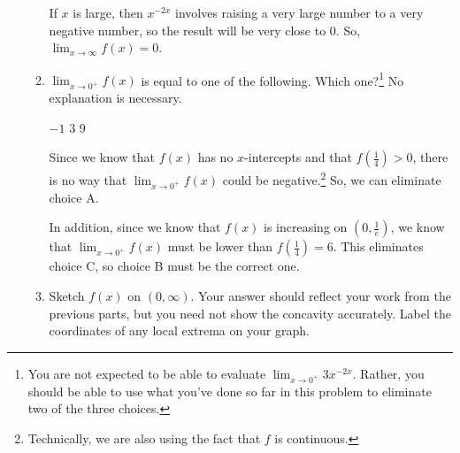 \documentclass{article}
\begin{document}
\begin{enumerate}
\begin{enumerate}
    \begin{solution}
      If $x$ is large, then $x^{-2x}$ involves raising a very large number
      to a very negative number, so the result will be very close to 0.
      So, $\displaystyle \lim_{x \to \infty} f(x) = \boxed{0}$.     
    \end{solution}

  \item 

    $\displaystyle \lim_{x \to 0^+} f(x)$ is equal to one of the
    following.  Which one?\footnote{You are not expected to be able to
      evaluate $\displaystyle \lim_{x \to 0^+} 3x^{-2x}$.  Rather, you
      should be able to use what you've done so far in this problem to
      eliminate two of the three choices.}  No explanation is necessary. 
    \begin{multicols}{3}
      \begin{enumerate}[label=\protect\maybecircle{\Alph*.}]
      \plainitem $-1$
      \circleitem $3$
      \plainitem $9$
      \end{enumerate}
    \end{multicols}

    \begin{solution}
      Since we know that $f(x)$ has no $x$-intercepts and that $f \left(
        \frac{1}{4} \right) > 0$, there is no way that $\displaystyle
      \lim_{x \to 0^+} f(x)$ could be negative.\footnote{Technically, we
        are also using the fact that $f$ is continuous.}  So, we can
      eliminate choice A.

      In addition, since we know that $f(x)$ is increasing on $\left( 0,
        \frac{1}{e} \right)$, we know that $\displaystyle \lim_{x \to 0^+}
      f(x)$ must be lower than $f \left( \frac{1}{4} \right) = 6$.  This
      eliminates choice C, so choice B must be the correct one. 
    \end{solution}


  \item
    \begin{problem}[\vfill]
      Sketch $f(x)$ on $(0, \infty)$.  Your answer should reflect your
      work from the previous parts, but you need not show the concavity
      accurately.  Label the coordinates of any local extrema on your
      graph.
    \end{problem}


\end{enumerate}
\end{enumerate}
\end{document}
